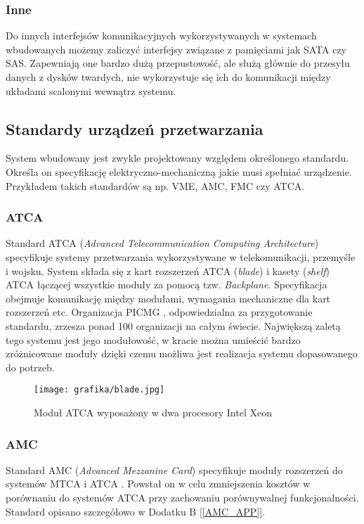 \subsubsection{Inne}
Do innych interfejsów komunikacyjnych wykorzystywanych w systemach wbudowanych możemy zaliczyć interfejsy związane z pamięciami jak SATA czy SAS. Zapewniają one bardzo dużą przepustowość, ale służą głównie do przesyłu danych z dysków twardych, nie wykorzystuje się ich do komunikacji między układami scalonymi wewnątrz systemu. 

\subsection{Standardy urządzeń przetwarzania}
System wbudowany jest zwykle projektowany względem określonego standardu. Określa on specyfikację elektryczno-mechaniczną jakie musi spełniać urządzenie. Przykładem takich standardów są np. VME, AMC, FMC czy ATCA. 

\subsubsection{ATCA}
Standard ATCA (\textit{Advanced Telecommunication Computing Architecture}) specyfikuje systemy przetwarzania wykorzystywane w telekomunikacji, przemyśle i wojsku. System składa się z kart rozszerzeń ATCA (\textit{blade}) i kasety (\textit{shelf}) ATCA łączącej wszystkie moduły za pomocą tzw. \textit{Backplane}. Specyfikacja obejmuje komunikację między modułami, wymagania mechaniczne dla kart rozszerzeń etc. Organizacja PICMG \cite{PICMG}, odpowiedzialna za przygotowanie standardu, zrzesza ponad 100 organizacji na całym świecie. Największą zaletą tego systemu jest jego modułowość, w kracie można umieścić bardzo zróżnicowane moduły dzięki czemu możliwa jest realizacja systemu dopasowanego do potrzeb. 


 	\begin{figure}[!ht]
	\begin{center}
	\texttt{[image: grafika/blade.jpg]}
	\end{center}
	\caption{Moduł ATCA wyposażony w dwa procesory Intel Xeon}
	\end{figure}
	 

\subsubsection{AMC}
Standard AMC (\textit{Advanced Mezzanine Card}) specyfikuje moduły rozszerzeń do systemów MTCA \cite{MICRO_TCA} i ATCA \cite{ATCA}. Powstał on w celu zmniejszenia kosztów w porównaniu do systemów ATCA przy zachowaniu porównywalnej funkcjonalności.  Standard opisano szczegółowo w Dodatku B  [\ref{AMC_APP}]. 

